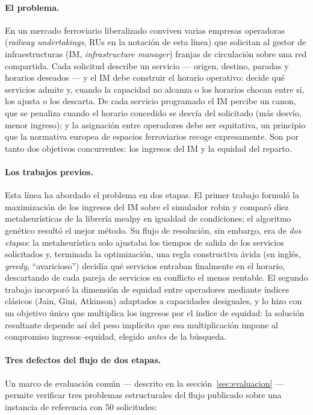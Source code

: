 \documentclass[11pt,a4paper]{article}
\newcommand{\ru}{\textup{RU}}
\begin{document}
\paragraph{El problema.} En un mercado ferroviario liberalizado conviven
varias empresas operadoras (\emph{railway undertakings}, \ru{}s en la
notación de esta línea) que solicitan al gestor de infraestructuras (IM,
\emph{infrastructure manager}) franjas de circulación sobre una red
compartida. Cada solicitud describe un servicio --- origen, destino,
paradas y horarios deseados --- y el IM debe construir el horario operativo:
decide qué servicios admite y, cuando la capacidad no alcanza o los
horarios chocan entre sí, los ajusta o los descarta. De cada servicio
programado el IM percibe un canon, que se penaliza cuando el horario
concedido se desvía del solicitado (más desvío, menor ingreso); y la
asignación entre operadores debe ser equitativa, un principio que la
normativa europea de espacios ferroviarios recoge expresamente. Son por
tanto dos objetivos concurrentes: los ingresos del IM y la equidad del
reparto.

\paragraph{Los trabajos previos.} Esta línea ha abordado el problema en dos
etapas. El primer trabajo \cite{paper1} formuló la maximización de los
ingresos del IM sobre el simulador robin \cite{robin} y comparó diez
metaheurísticas de la librería mealpy \cite{mealpy} en igualdad de
condiciones; el algoritmo genético resultó el mejor método. Su flujo de
resolución, sin embargo, era de \emph{dos etapas}: la metaheurística solo
ajustaba los tiempos de salida de los servicios solicitados y, terminada la
optimización, una regla constructiva ávida (en inglés, \emph{greedy},
``avaricioso'') decidía qué servicios entraban finalmente en el horario,
descartando de cada pareja de servicios en conflicto el menos rentable.
El segundo trabajo \cite{paper2} incorporó la dimensión de equidad entre
operadores mediante índices clásicos (Jain, Gini, Atkinson) adaptados a
capacidades desiguales, y lo hizo con un objetivo único que multiplica los
ingresos por el índice de equidad: la solución resultante depende así del
peso implícito que esa multiplicación impone al compromiso
ingresos--equidad, elegido \emph{antes} de la búsqueda.

\paragraph{Tres defectos del flujo de dos etapas.} Un marco de evaluación
común --- descrito en la sección~\ref{sec:evaluacion} --- permite verificar
tres problemas estructurales del flujo publicado sobre una instancia de
referencia con 50 solicitudes:
\end{document}
